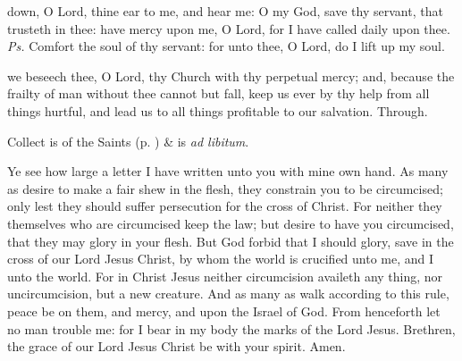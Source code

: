 


\properantiphonfix

\introit
{} down, O Lord, thine ear to me, and hear me: O my God, save thy servant, that trusteth in thee: have mercy upon me, O Lord, for I have called daily upon thee. \textit{Ps.} Comfort the soul of thy servant: for unto thee, O Lord, do I lift up my soul.

\vspace{-1ex}

\collect
{} we beseech thee, O Lord, thy Church with thy perpetual mercy; and, because the frailty of man without thee cannot but fall, keep us ever by thy help from all things hurtful, and lead us to all things profitable to our salvation. Through.
\begin{rubric}
     Collect is of the Saints (p. \pageref{SPSaints}) \&  is \emph{ad libitum}.
\end{rubric}

\vspace{-1ex}

 Ye see how large a letter I have written unto you with mine own hand. As many as desire to make a fair shew in the flesh, they constrain you to be circumcised; only lest they should suffer persecution for the cross of Christ. For neither they themselves who are circumcised keep the law; but desire to have you circumcised, that they may glory in your flesh. But God forbid that I should glory, save in the cross of our Lord Jesus Christ, by whom the world is crucified unto me, and I unto the world. For in Christ Jesus neither circumcision availeth any thing, nor uncircumcision, but a new creature. And as many as walk according to this rule, peace be on them, and mercy, and upon the Israel of God. From henceforth let no man trouble me: for I bear in my body the marks of the Lord Jesus. Brethren, the grace of our Lord Jesus Christ be with your spirit. Amen.



